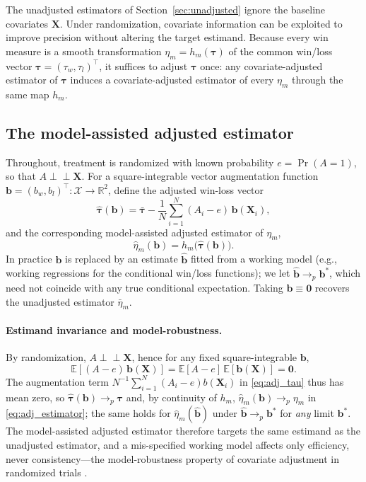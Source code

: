 \documentclass[11pt,a4paper]{article}
\newcommand{\E}{\mathbb{E}}
\begin{document}
The unadjusted estimators of Section~\ref{sec:unadjusted} ignore the baseline covariates $\mathbf{X}$.
Under randomization, covariate information can be exploited to improve precision without
altering the target estimand. Because every win measure is a smooth transformation
$\eta_m=h_m(\boldsymbol\tau)$ of the common win/loss vector
$\boldsymbol\tau=(\tau_w,\tau_l)^\top$, it suffices to adjust $\boldsymbol\tau$ once: any
covariate-adjusted estimator of $\boldsymbol\tau$ induces a covariate-adjusted estimator of
every $\eta_m$ through the same map $h_m$.

\subsection{The model-assisted adjusted estimator}

Throughout, treatment is randomized with known probability $e=\Pr(A=1)$, so that
$A\perp\!\!\!\perp \mathbf{X}$. For a square-integrable vector augmentation function
$\boldsymbol b=(b_w,b_l)^\top:\mathcal X\to\mathbb R^2$, define the adjusted win-loss vector
\begin{equation}\label{eq:adj_tau}
   \hat{\boldsymbol\tau}(\boldsymbol b)
   =\bar{\boldsymbol\tau}-\frac1N\sum_{i=1}^N (A_i-e)\,\boldsymbol b(\mathbf{X}_i),
\end{equation}
and the corresponding model-assisted adjusted estimator of $\eta_m$,
\begin{equation}\label{eq:adj_estimator}
   \hat\eta_m(\boldsymbol b)=h_m\bigl(\hat{\boldsymbol\tau}(\boldsymbol b)\bigr).
\end{equation}
In practice $\boldsymbol b$ is replaced by an estimate $\hat{\boldsymbol b}$ fitted from a working model (e.g., working regressions for the conditional win/loss functions); we let
$\hat{\boldsymbol b} \to_p \boldsymbol b^\ast$, which need not coincide with any
true conditional expectation. Taking $\boldsymbol b\equiv\boldsymbol 0$ recovers the
unadjusted estimator $\bar\eta_m$.

\paragraph{Estimand invariance and model-robustness.}
By randomization, $A\perp\!\!\!\perp \mathbf{X}$, hence for any fixed square-integrable
$\boldsymbol b$,
\[
   \E[(A-e)\,\boldsymbol b(\mathbf{X})]=\E[A-e]\,\E[\boldsymbol b(\mathbf{X})]=\boldsymbol 0 .
\]
The augmentation term $N^{-1}\sum_{i=1}^N(A_i-e)b(\mathbf{X}_i)$ in \eqref{eq:adj_tau} thus has mean zero, so
$\hat{\boldsymbol\tau}(\boldsymbol b)\to_p\boldsymbol\tau$ and, by continuity of $h_m$,
$\hat\eta_m(\boldsymbol b)\to_p\eta_m$ in \eqref{eq:adj_estimator}; the same holds for $\hat\eta_m(\hat{\boldsymbol b})$
under $\hat{\boldsymbol b}\to_p\boldsymbol b^\ast$ for \emph{any} limit $\boldsymbol b^\ast$.
The model-assisted adjusted estimator therefore targets the same estimand as the unadjusted estimator,
and a mis-specified working model affects only efficiency, never consistency---the
model-robustness property of covariate adjustment in randomized trials \citep{tsiatis2008covariate, zhang2025unified}.
\end{document}

